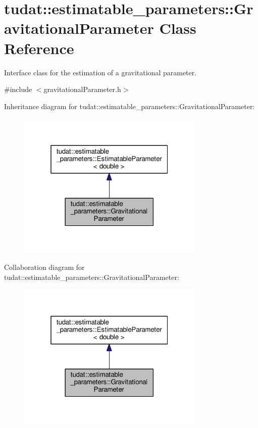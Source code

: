 \hypertarget{classtudat_1_1estimatable__parameters_1_1GravitationalParameter}{}\section{tudat\+:\+:estimatable\+\_\+parameters\+:\+:Gravitational\+Parameter Class Reference}
\label{classtudat_1_1estimatable__parameters_1_1GravitationalParameter}


Interface class for the estimation of a gravitational parameter.  




{\ttfamily \#include $<$gravitational\+Parameter.\+h$>$}



Inheritance diagram for tudat\+:\+:estimatable\+\_\+parameters\+:\+:Gravitational\+Parameter\+:
\nopagebreak
\begin{figure}[H]
\begin{center}
\leavevmode
\includegraphics[width=253pt]{classtudat_1_1estimatable__parameters_1_1GravitationalParameter__inherit__graph}
\end{center}
\end{figure}


Collaboration diagram for tudat\+:\+:estimatable\+\_\+parameters\+:\+:Gravitational\+Parameter\+:
\nopagebreak
\begin{figure}[H]
\begin{center}
\leavevmode
\includegraphics[width=253pt]{classtudat_1_1estimatable__parameters_1_1GravitationalParameter__coll__graph}
\end{center}
\end{figure}
